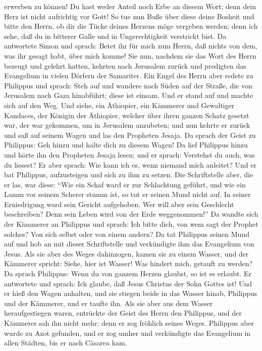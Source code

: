 erwerben zu können!  Du hast weder Anteil noch Erbe an
diesem Wort; denn dein Herz ist nicht aufrichtig vor Gott!
 So tue nun Buße über diese deine Bosheit und bitte den
Herrn, ob dir die Tücke deines Herzens möge vergeben werden;
 denn ich sehe, daß du in bitterer Galle und in
Ungerechtigkeit verstrickt bist.  Da antwortete Simon und
sprach: Betet ihr für mich zum Herrn, daß nichts von dem, was ihr gesagt
habt, über mich komme!  Sie nun, nachdem sie das Wort des
Herrn bezeugt und gelehrt hatten, kehrten nach Jerusalem zurück und
predigten das Evangelium in vielen Dörfern der Samariter.
 Ein Engel des Herrn aber redete zu Philippus und sprach:
Steh auf und wandere nach Süden auf der Straße, die von Jerusalem nach
Gaza hinabführt; diese ist einsam.  Und er stand auf und
machte sich auf den Weg. Und siehe, ein Äthiopier, ein Kämmerer und
Gewaltiger Kandaces, der Königin der Äthiopier, welcher über ihren
ganzen Schatz gesetzt war, der war gekommen, um in Jerusalem anzubeten;
 und nun kehrte er zurück und saß auf seinem Wagen und
las den Propheten Jesaja.  Da sprach der Geist zu
Philippus: Geh hinzu und halte dich zu diesem Wagen!  Da
lief Philippus hinzu und hörte ihn den Propheten Jesaja lesen; und er
sprach: Verstehst du auch, was du liesest?  Er aber
sprach: Wie kann ich es, wenn niemand mich anleitet? Und er bat
Philippus, aufzusteigen und sich zu ihm zu setzen.  Die
Schriftstelle aber, die er las, war diese: ``Wie ein Schaf ward er zur
Schlachtung geführt, und wie ein Lamm vor seinem Scherer stumm ist, so
tut er seinen Mund nicht auf.  In seiner Erniedrigung
ward sein Gericht aufgehoben. Wer will aber sein Geschlecht beschreiben?
Denn sein Leben wird von der Erde weggenommen!''  Da
wandte sich der Kämmerer an Philippus und sprach: Ich bitte dich, von
wem sagt der Prophet solches? Von sich selbst oder von einem andern?
 Da tat Philippus seinen Mund auf und hob an mit dieser
Schriftstelle und verkündigte ihm das Evangelium von Jesus.
 Als sie aber des Weges dahinzogen, kamen sie zu einem
Wasser, und der Kämmerer spricht: Siehe, hier ist Wasser! Was hindert
mich, getauft zu werden?  Da sprach Philippus: Wenn du
von ganzem Herzen glaubst, so ist es erlaubt. Er antwortete und sprach:
Ich glaube, daß Jesus Christus der Sohn Gottes ist!  Und
er hieß den Wagen anhalten, und sie stiegen beide in das Wasser hinab,
Philippus und der Kämmerer, und er taufte ihn.  Als sie
aber aus dem Wasser heraufgestiegen waren, entrückte der Geist des Herrn
den Philippus, und der Kämmerer sah ihn nicht mehr; denn er zog fröhlich
seines Weges.  Philippus aber wurde zu Azot gefunden, und
er zog umher und verkündigte das Evangelium in allen Städten, bis er
nach Cäsarea kam.

